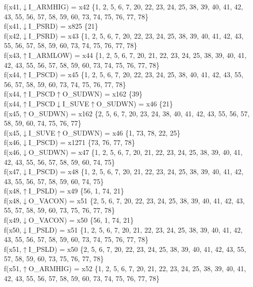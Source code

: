 f(x41,$\downarrow$I\_ARMHIG) = x42 \{1, 2, 5, 6, 7, 20, 22, 23, 24, 25, 38, 39, 40, 41, 42, 43, 55, 56, 57, 58, 59, 60, 73, 74, 75, 76, 77, 78\} \\  
f(x41,$\downarrow$I\_PSRD) = x825 \{21\} \\  
f(x42,$\downarrow$I\_PSRD) = x43 \{1, 2, 5, 6, 7, 20, 22, 23, 24, 25, 38, 39, 40, 41, 42, 43, 55, 56, 57, 58, 59, 60, 73, 74, 75, 76, 77, 78\} \\  
f(x43,$\uparrow$I\_ARMLOW) = x44 \{1, 2, 5, 6, 7, 20, 21, 22, 23, 24, 25, 38, 39, 40, 41, 42, 43, 55, 56, 57, 58, 59, 60, 73, 74, 75, 76, 77, 78\} \\  
f(x44,$\uparrow$I\_PSCD) = x45 \{1, 2, 5, 6, 7, 20, 22, 23, 24, 25, 38, 40, 41, 42, 43, 55, 56, 57, 58, 59, 60, 73, 74, 75, 76, 77, 78\} \\  
f(x44,$\uparrow$I\_PSCD$\uparrow$O\_SUDWN) = x162 \{39\} \\  
f(x44,$\uparrow$I\_PSCD$\downarrow$I\_SUVE$\uparrow$O\_SUDWN) = x46 \{21\} \\  
f(x45,$\uparrow$O\_SUDWN) = x162 \{2, 5, 6, 7, 20, 23, 24, 38, 40, 41, 42, 43, 55, 56, 57, 58, 59, 60, 74, 75, 76, 77\} \\  
f(x45,$\downarrow$I\_SUVE$\uparrow$O\_SUDWN) = x46 \{1, 73, 78, 22, 25\} \\  
f(x46,$\downarrow$I\_PSCD) = x1271 \{73, 76, 77, 78\} \\  
f(x46,$\downarrow$O\_SUDWN) = x47 \{1, 2, 5, 6, 7, 20, 21, 22, 23, 24, 25, 38, 39, 40, 41, 42, 43, 55, 56, 57, 58, 59, 60, 74, 75\} \\  
f(x47,$\downarrow$I\_PSCD) = x48 \{1, 2, 5, 6, 7, 20, 21, 22, 23, 24, 25, 38, 39, 40, 41, 42, 43, 55, 56, 57, 58, 59, 60, 74, 75\} \\  
f(x48,$\uparrow$I\_PSLD) = x49 \{56, 1, 74, 21\} \\  
f(x48,$\downarrow$O\_VACON) = x51 \{2, 5, 6, 7, 20, 22, 23, 24, 25, 38, 39, 40, 41, 42, 43, 55, 57, 58, 59, 60, 73, 75, 76, 77, 78\} \\  
f(x49,$\downarrow$O\_VACON) = x50 \{56, 1, 74, 21\} \\  
f(x50,$\downarrow$I\_PSLD) = x51 \{1, 2, 5, 6, 7, 20, 21, 22, 23, 24, 25, 38, 39, 40, 41, 42, 43, 55, 56, 57, 58, 59, 60, 73, 74, 75, 76, 77, 78\} \\  
f(x51,$\uparrow$I\_PSLD) = x50 \{2, 5, 6, 7, 20, 22, 23, 24, 25, 38, 39, 40, 41, 42, 43, 55, 57, 58, 59, 60, 73, 75, 76, 77, 78\} \\  
f(x51,$\uparrow$O\_ARMHIG) = x52 \{1, 2, 5, 6, 7, 20, 21, 22, 23, 24, 25, 38, 39, 40, 41, 42, 43, 55, 56, 57, 58, 59, 60, 73, 74, 75, 76, 77, 78\} \\  
